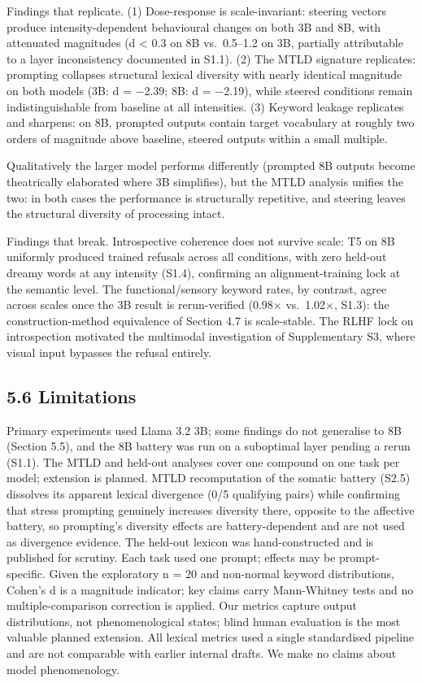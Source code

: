\documentclass[11pt,a4paper]{article}
\begin{document}
Findings that replicate. (1) Dose-response is scale-invariant: steering vectors produce intensity-dependent behavioural changes on both 3B and 8B, with attenuated magnitudes (d \textless{} 0.3 on 8B vs.~0.5--1.2 on 3B, partially attributable to a layer inconsistency documented in S1.1). (2) The MTLD signature replicates: prompting collapses structural lexical diversity with nearly identical magnitude on both models (3B: d = −2.39; 8B: d = −2.19), while steered conditions remain indistinguishable from baseline at all intensities. (3) Keyword leakage replicates and sharpens: on 8B, prompted outputs contain target vocabulary at roughly two orders of magnitude above baseline, steered outputs within a small multiple.

Qualitatively the larger model performs differently (prompted 8B outputs become theatrically elaborated where 3B simplifies), but the MTLD analysis unifies the two: in both cases the performance is structurally repetitive, and steering leaves the structural diversity of processing intact.

Findings that break. Introspective coherence does not survive scale: T5 on 8B uniformly produced trained refusals across all conditions, with zero held-out dreamy words at any intensity (S1.4), confirming an alignment-training lock at the semantic level. The functional/sensory keyword rates, by contrast, agree across scales once the 3B result is rerun-verified (0.98× vs.~1.02×, S1.3): the construction-method equivalence of Section 4.7 is scale-stable. The RLHF lock on introspection motivated the multimodal investigation of Supplementary S3, where visual input bypasses the refusal entirely.

\subsection*{5.6 Limitations}

Primary experiments used Llama 3.2 3B; some findings do not generalise to 8B (Section 5.5), and the 8B battery was run on a suboptimal layer pending a rerun (S1.1). The MTLD and held-out analyses cover one compound on one task per model; extension is planned. MTLD recomputation of the somatic battery (S2.5) dissolves its apparent lexical divergence (0/5 qualifying pairs) while confirming that stress prompting genuinely increases diversity there, opposite to the affective battery, so prompting's diversity effects are battery-dependent and are not used as divergence evidence. The held-out lexicon was hand-constructed and is published for scrutiny. Each task used one prompt; effects may be prompt-specific. Given the exploratory n = 20 and non-normal keyword distributions, Cohen's d is a magnitude indicator; key claims carry Mann-Whitney tests and no multiple-comparison correction is applied. Our metrics capture output distributions, not phenomenological states; blind human evaluation is the most valuable planned extension. All lexical metrics used a single standardised pipeline and are not comparable with earlier internal drafts. We make no claims about model phenomenology.
\end{document}
